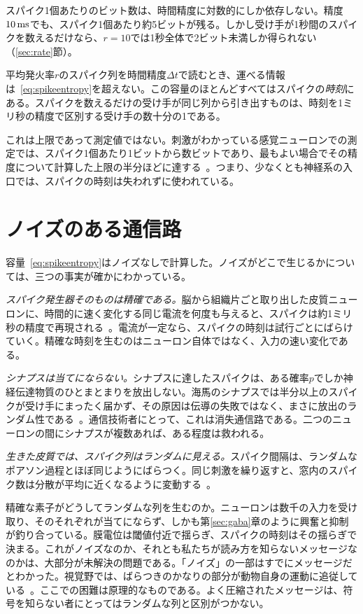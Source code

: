 スパイク1個あたりのビット数は、時間精度に対数的にしか依存しない。精度$10\,\text{ms}$でも、スパイク1個あたり約5ビットが残る。しかし受け手が1秒間のスパイクを数えるだけなら、$r=10$では1秒全体で2ビット未満しか得られない（\ref{sec:rate}節）。

\begin{keyblock}
\begin{proposition}[スパイク通信路の容量]
\label{prop:capacity}
平均発火率$r$のスパイク列を時間精度$\Delta t$で読むとき、運べる情報は~\eqref{eq:spikeentropy}を超えない。この容量のほとんどすべてはスパイクの\emph{時刻}にある。スパイクを数えるだけの受け手が同じ列から引き出すものは、時刻を1ミリ秒の精度で区別する受け手の数十分の1である。
\end{proposition}
\end{keyblock}

これは上限であって測定値ではない。刺激がわかっている感覚ニューロンでの測定では、スパイク1個あたり1ビットから数ビットであり、最もよい場合でその精度について計算した上限の半分ほどに達する~\cite{Rieke1997}。つまり、少なくとも神経系の入口では、スパイクの時刻は失われずに使われている。

\section{ノイズのある通信路}

容量~\eqref{eq:spikeentropy}はノイズなしで計算した。ノイズがどこで生じるかについては、三つの事実が確かにわかっている。

\emph{スパイク発生器そのものは精確である。}脳から組織片ごと取り出した皮質ニューロンに、時間的に速く変化する同じ電流を何度も与えると、スパイクは約1ミリ秒の精度で再現される~\cite{Mainen1995}。電流が一定なら、スパイクの時刻は試行ごとにばらけていく。精確な時刻を生むのはニューロン自体ではなく、入力の速い変化である。

\emph{シナプスは当てにならない。}シナプスに達したスパイクは、ある確率$p$でしか神経伝達物質のひとまとまりを放出しない。海馬のシナプスでは半分以上のスパイクが受け手にまったく届かず、その原因は伝導の失敗ではなく、まさに放出のランダム性である~\cite{AllenStevens1994}。通信技術者にとって、これは消失通信路である。二つのニューロンの間にシナプスが複数あれば、ある程度は救われる。

\emph{生きた皮質では、スパイク列はランダムに見える。}スパイク間隔は、ランダムなポアソン過程とほぼ同じようにばらつく。同じ刺激を繰り返すと、窓内のスパイク数は分散が平均に近くなるように変動する~\cite{Softky1993}。

精確な素子がどうしてランダムな列を生むのか。ニューロンは数千の入力を受け取り、そのそれぞれが当てにならず、しかも第\ref{sec:gaba}章のように興奮と抑制が釣り合っている。膜電位は閾値付近で揺らぎ、スパイクの時刻はその揺らぎで決まる。これがノイズなのか、それとも私たちが読み方を知らないメッセージなのかは、大部分が未解決の問題である。「ノイズ」の一部はすでにメッセージだとわかった。視覚野では、ばらつきのかなりの部分が動物自身の運動に追従している~\cite{Stringer2019}。ここでの困難は原理的なものである。よく圧縮されたメッセージは、符号を知らない者にとってはランダムな列と区別がつかない。

